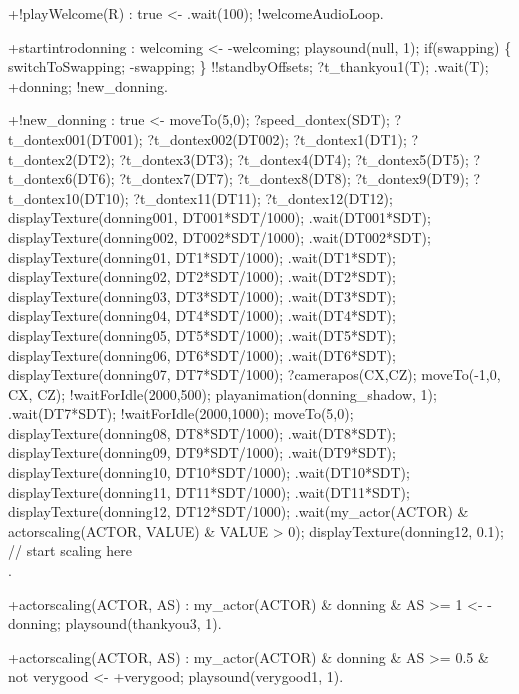 \documentclass[draft,final]{vutinfth} %
\begin{document}
{+!playWelcome(R) : true
    <-  .wait(100);
        !welcomeAudioLoop.

+startintrodonning : welcoming
    <-  -welcoming;
        playsound(null, 1);
        if(swapping)
        \{
            switchToSwapping;
            -swapping;
        \}
        !!standbyOffsets;
        ?t\_thankyou1(T);
        .wait(T);
        +donning;
        !new\_donning.

+!new\_donning : true
    <-  moveTo(5,0);
        ?speed\_dontex(SDT);
        ?t\_dontex001(DT001);
        ?t\_dontex002(DT002);
        ?t\_dontex1(DT1);
        ?t\_dontex2(DT2);
        ?t\_dontex3(DT3);
        ?t\_dontex4(DT4);
        ?t\_dontex5(DT5);
        ?t\_dontex6(DT6);
        ?t\_dontex7(DT7);
        ?t\_dontex8(DT8);
        ?t\_dontex9(DT9);
        ?t\_dontex10(DT10);
        ?t\_dontex11(DT11);
        ?t\_dontex12(DT12);
        displayTexture(donning001, DT001*SDT/1000);
        .wait(DT001*SDT);
        displayTexture(donning002, DT002*SDT/1000);
        .wait(DT002*SDT);
        displayTexture(donning01, DT1*SDT/1000);
        .wait(DT1*SDT);
        displayTexture(donning02, DT2*SDT/1000);
        .wait(DT2*SDT);
        displayTexture(donning03, DT3*SDT/1000);
        .wait(DT3*SDT);
        displayTexture(donning04, DT4*SDT/1000);
        .wait(DT4*SDT);
        displayTexture(donning05, DT5*SDT/1000);
        .wait(DT5*SDT);
        displayTexture(donning06, DT6*SDT/1000);
        .wait(DT6*SDT);
        displayTexture(donning07, DT7*SDT/1000);
        ?camerapos(CX,CZ);
        moveTo(-1,0, CX, CZ);
        !waitForIdle(2000,500);
        playanimation(donning\_shadow, 1);
        .wait(DT7*SDT);
        !waitForIdle(2000,1000);
        moveTo(5,0);
        displayTexture(donning08, DT8*SDT/1000);
        .wait(DT8*SDT);
        displayTexture(donning09, DT9*SDT/1000);
        .wait(DT9*SDT);
        displayTexture(donning10, DT10*SDT/1000);
        .wait(DT10*SDT);
        displayTexture(donning11, DT11*SDT/1000);
        .wait(DT11*SDT);
        displayTexture(donning12, DT12*SDT/1000);
        .wait(my\_actor(ACTOR) \& actorscaling(ACTOR, VALUE) \& VALUE > 0);
        displayTexture(donning12, 0.1);\\
        // start scaling here\\
        .

+actorscaling(ACTOR, AS) : my\_actor(ACTOR) \& donning \& AS >= 1
    <-  -donning;
        playsound(thankyou3, 1).

+actorscaling(ACTOR, AS) : my\_actor(ACTOR) \& donning \& AS >= 0.5 \& not verygood
    <-  +verygood;
        playsound(verygood1, 1).

}
\end{document}

